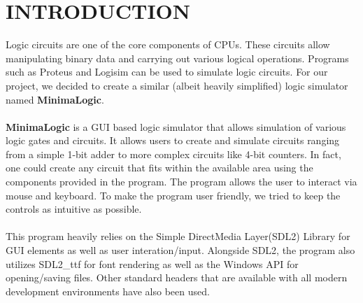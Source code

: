 \documentclass[report]{subfiles}
\begin{document}
\chapter{INTRODUCTION}
    Logic circuits are one of the core components of CPUs. These circuits allow manipulating binary data and carrying out various logical operations.
    Programs such as Proteus and Logisim can be used to simulate logic circuits.
    For our project, we decided to create a similar (albeit heavily simplified) logic simulator named \textbf{MinimaLogic}.
    \\\\
    \textbf{MinimaLogic} is a GUI based logic simulator that allows simulation of various logic gates and circuits.
    It allows users to create and simulate circuits ranging from a simple 1-bit adder to more complex circuits like 4-bit counters.
    In fact, one could create any circuit that fits within the available area using the components provided in the program.
    The program allows the user to interact via mouse and keyboard. To make the program user friendly, we tried to keep the controls as intuitive as possible.
    \\\\
    This program heavily relies on the Simple DirectMedia Layer(SDL2) Library for GUI elements as well as user interation/input. 
    Alongside SDL2, the program also utilizes SDL2\_ttf for font rendering as well as the Windows API for opening/saving files.
    Other standard headers that are available with all modern development environments have also been used.
\end{document}
